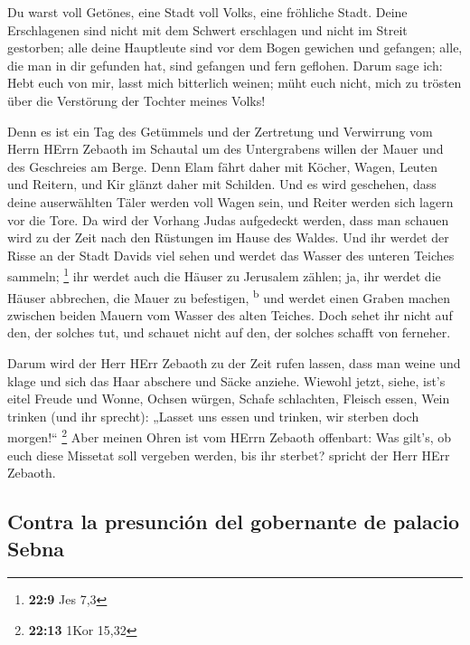 Du warst voll Getönes, eine Stadt voll Volks, eine
fröhliche Stadt. Deine Erschlagenen sind nicht mit dem Schwert
erschlagen und nicht im Streit gestorben;  alle deine
Hauptleute sind vor dem Bogen gewichen und gefangen; alle, die man in
dir gefunden hat, sind gefangen und fern geflohen.  Darum
sage ich: Hebt euch von mir, lasst mich bitterlich weinen; müht euch
nicht, mich zu trösten über die Verstörung der Tochter meines Volks!

 Denn es ist ein Tag des Getümmels und der Zertretung und
Verwirrung vom Herrn HErrn Zebaoth im Schautal um des Untergrabens
willen der Mauer und des Geschreies am Berge.  Denn Elam
fährt daher mit Köcher, Wagen, Leuten und Reitern, und Kir glänzt daher
mit Schilden.  Und es wird geschehen, dass deine
auserwählten Täler werden voll Wagen sein, und Reiter werden sich lagern
vor die Tore.  Da wird der Vorhang Judas aufgedeckt
werden, dass man schauen wird zu der Zeit nach den Rüstungen im Hause
des Waldes.  Und ihr werdet der Risse an der Stadt Davids
viel sehen und werdet das Wasser des unteren Teiches sammeln;
\footnote{\textbf{22:9} Jes 7,3}  ihr werdet auch die
Häuser zu Jerusalem zählen; ja, ihr werdet die Häuser abbrechen, die
Mauer zu befestigen, \textsuperscript{b}  und werdet
einen Graben machen zwischen beiden Mauern vom Wasser des alten Teiches.
Doch sehet ihr nicht auf den, der solches tut, und schauet nicht auf
den, der solches schafft von ferneher.

 Darum wird der Herr HErr Zebaoth zu der Zeit rufen
lassen, dass man weine und klage und sich das Haar abschere und Säcke
anziehe.  Wiewohl jetzt, siehe, ist's eitel Freude und
Wonne, Ochsen würgen, Schafe schlachten, Fleisch essen, Wein trinken
(und ihr sprecht): „Lasset uns essen und trinken, wir sterben doch
morgen!{}`` \footnote{\textbf{22:13} 1Kor 15,32}  Aber
meinen Ohren ist vom HErrn Zebaoth offenbart: Was gilt's, ob euch diese
Missetat soll vergeben werden, bis ihr sterbet? spricht der Herr HErr
Zebaoth.

\hypertarget{contra-la-presunciuxf3n-del-gobernante-de-palacio-sebna}{%
\subsection{Contra la presunción del gobernante de palacio
Sebna}\label{contra-la-presunciuxf3n-del-gobernante-de-palacio-sebna}}

